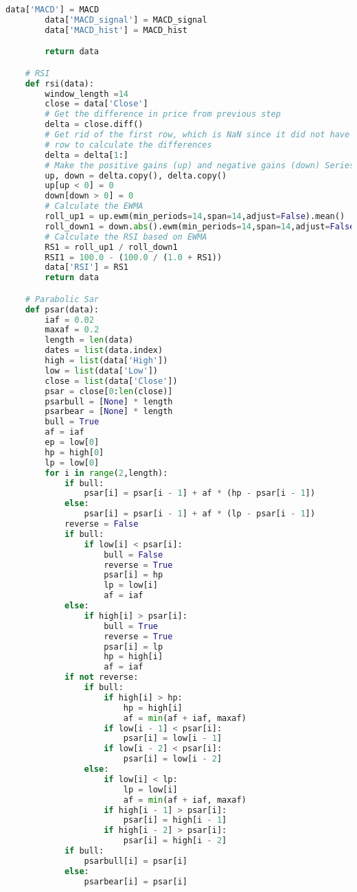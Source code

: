 \documentclass[11pt]{report}
\begin{document}
\begin{lstlisting}[language = python]
        data['MACD'] = MACD 
        data['MACD_signal'] = MACD_signal
        data['MACD_hist'] = MACD_hist

        return data

    # RSI
    def rsi(data):
        window_length =14
        close = data['Close']
        # Get the difference in price from previous step
        delta = close.diff()
        # Get rid of the first row, which is NaN since it did not have a previous
        # row to calculate the differences
        delta = delta[1:]
        # Make the positive gains (up) and negative gains (down) Series
        up, down = delta.copy(), delta.copy()
        up[up < 0] = 0
        down[down > 0] = 0
        # Calculate the EWMA
        roll_up1 = up.ewm(min_periods=14,span=14,adjust=False).mean()
        roll_down1 = down.abs().ewm(min_periods=14,span=14,adjust=False).mean()
        # Calculate the RSI based on EWMA
        RS1 = roll_up1 / roll_down1
        RSI1 = 100.0 - (100.0 / (1.0 + RS1))
        data['RSI'] = RS1
        return data

    # Parabolic Sar
    def psar(data):
        iaf = 0.02
        maxaf = 0.2
        length = len(data)
        dates = list(data.index)
        high = list(data['High'])
        low = list(data['Low'])
        close = list(data['Close'])
        psar = close[0:len(close)]
        psarbull = [None] * length
        psarbear = [None] * length
        bull = True
        af = iaf
        ep = low[0]
        hp = high[0]
        lp = low[0]
        for i in range(2,length):
            if bull:
                psar[i] = psar[i - 1] + af * (hp - psar[i - 1])
            else:
                psar[i] = psar[i - 1] + af * (lp - psar[i - 1])
            reverse = False
            if bull:
                if low[i] < psar[i]:
                    bull = False
                    reverse = True
                    psar[i] = hp
                    lp = low[i]
                    af = iaf
            else:
                if high[i] > psar[i]:
                    bull = True
                    reverse = True
                    psar[i] = lp
                    hp = high[i]
                    af = iaf
            if not reverse:
                if bull:
                    if high[i] > hp:
                        hp = high[i]
                        af = min(af + iaf, maxaf)
                    if low[i - 1] < psar[i]:
                        psar[i] = low[i - 1]
                    if low[i - 2] < psar[i]:
                        psar[i] = low[i - 2]
                else:
                    if low[i] < lp:
                        lp = low[i]
                        af = min(af + iaf, maxaf)
                    if high[i - 1] > psar[i]:
                        psar[i] = high[i - 1]
                    if high[i - 2] > psar[i]:
                        psar[i] = high[i - 2]
            if bull:
                psarbull[i] = psar[i]
            else:
                psarbear[i] = psar[i]


\end{lstlisting}
\end{document}
